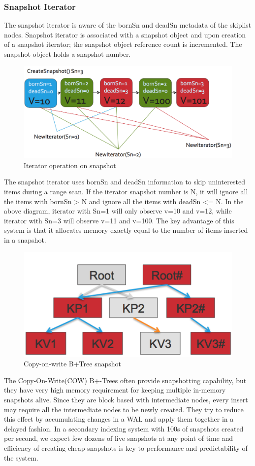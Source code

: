 \documentclass{vldb}
\begin{document}
\subsubsection{Snapshot Iterator}
The snapshot iterator is aware of the bornSn and deadSn metadata of the skiplist nodes. Snapshot iterator is associated with a snapshot object and upon creation of a snapshot iterator; the snapshot object reference count is incremented. The snapshot object holds a snapshot number.
 \begin{figure}[h]
\includegraphics[scale=0.28]{images/fig-5}
\caption{Iterator operation on snapshot}
\label{fig:snap-iterator}
\end{figure}

The snapshot iterator uses bornSn and deadSn information to skip uninterested items during a range scan. If the iterator snapshot number is N, it will ignore all the items with bornSn > N and ignore all the items with deadSn <= N. In the above diagram, iterator with Sn=1 will only observe v=10 and v=12, while iterator with Sn=3 will observe v=11 and v=100.
    The key advantage of this system is that it allocates memory exactly equal to the number of items inserted in a snapshot. 

 \begin{figure}[h]
\includegraphics[scale=0.28]{images/fig-6}
\caption{Copy-on-write B+Tree snapshot}
\label{fig:btree-cow}
\end{figure}
The Copy-On-Write(COW) B+-Trees often provide snapshotting capability, but they have very high memory requirement for keeping multiple in-memory snapshots alive. Since they are block based with intermediate nodes, every insert may require all the intermediate nodes to be newly created. They try to reduce this effect by accumulating changes in a WAL and apply them together in a delayed fashion. In a secondary indexing system with 100s of snapshots created per second, we expect few dozens of live snapshots at any point of time and efficiency of creating cheap snapshots is key to performance and predictability of the system.
\end{document}
